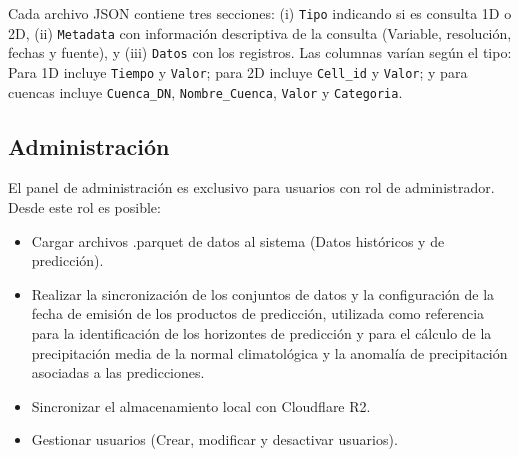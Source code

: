 \begin{example}
Cada archivo JSON contiene tres secciones: (i) \texttt{Tipo} indicando si es consulta 1D o 2D, (ii) \texttt{Metadata} con información descriptiva de la consulta (Variable, resolución, fechas y fuente), y (iii) \texttt{Datos} con los registros. Las columnas varían según el tipo: Para 1D incluye \texttt{Tiempo} y \texttt{Valor}; para 2D incluye \texttt{Cell\_id} y \texttt{Valor}; y para cuencas incluye \texttt{Cuenca\_DN}, \texttt{Nombre\_Cuenca}, \texttt{Valor} y \texttt{Categoria}.
\end{example}

\subsection{Administración}
\label{subsec:administracion}

El panel de administración es exclusivo para usuarios con rol de administrador. Desde este rol es posible:

\begin{itemize}
    \item Cargar archivos .parquet de datos al sistema (Datos históricos y de predicción).
    \item Realizar la sincronización de los conjuntos de datos y la configuración de la fecha de emisión de los productos de predicción, utilizada como referencia para la identificación de los horizontes de predicción y para el cálculo de la precipitación media de la normal climatológica y la anomalía de precipitación asociadas a las predicciones.
    \item Sincronizar el almacenamiento local con Cloudflare R2.
    \item Gestionar usuarios (Crear, modificar y desactivar usuarios).
\end{itemize}
